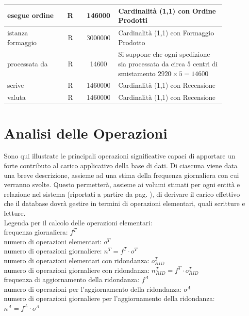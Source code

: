 \documentclass[12pt,a4paper]{article}
\begin{document}
\begin{center}
\begin{longtable}{|p{0.23\linewidth}|p{0.1\linewidth}|p{0.11\linewidth}|p{0.45\linewidth}|}
\hline
esegue ordine
 & 
\multicolumn{1}{|c|}{R}
 & 
\multicolumn{1}{|c|}{146000}
 & 
Cardinalità (1,1) con Ordine Prodotti
\\

\hline
istanza formaggio
 & 
\multicolumn{1}{|c|}{R}
 & 
\multicolumn{1}{|c|}{3000000}
 & 
Cardinalità (1,1) con Formaggio Prodotto
\\

\hline
processata da
 & 
\multicolumn{1}{|c|}{R}
 & 
\multicolumn{1}{|c|}{14600}
 & 
Si suppone che ogni spedizione sia processata da circa 5 centri di smistamento $2920\times 5=14600$
\\

\hline
scrive
 & 
\multicolumn{1}{|c|}{R}
 & 
\multicolumn{1}{|c|}{1460000}
 & 
Cardinalità (1,1) con Recensione
\\

\hline
valuta
 & 
\multicolumn{1}{|c|}{R}
 & 
\multicolumn{1}{|c|}{1460000}
 & 
\vspace{-25pt}Cardinalità (1,1) con Recensione
\\

\hline

\end{longtable}\end{center}

\newpage
\section{Analisi delle Operazioni}
\label{sec:operazioni}
Sono qui illustrate le principali operazioni significative capaci di apportare un forte contributo al carico applicativo della base di dati.
Di ciascuna viene data una breve descrizione, assieme ad una stima della frequenza giornaliera con cui verranno svolte.
Questo permetterà, assieme ai volumi stimati per ogni entità e relazione nel sistema (riportati a partire da pag. \pageref{sec:volumi}), di derivare il carico effettivo che il database dovrà gestire in termini di operazioni elementari, quali scritture e letture.
\\

Legenda per il calcolo delle operazioni elementari:
\\
frequenza giornaliera: $f^T$\\ numero di operazioni elementari: $o^T$\\ numero di operazioni giornaliere: $n^T = f^T\cdot o^T$\\numero di operazioni elementari con ridondanza: $o^T_{RID}$\\numero di operazioni giornaliere con ridondanza: $n^T_{RID}=f^T\cdot o^T_{RID}$\\frequenza di aggiornamento della ridondanza: $f^A$\\numero di operazioni per l'aggiornamento della ridondanza: $o^A$\\numero di operazioni giornaliere per l'aggiornamento della ridondanza: $n^A = f^A\cdot o^A$
\end{document}

